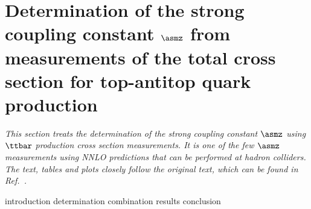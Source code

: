 \section{Determination of the strong coupling constant \texorpdfstring{$\asmz$}{alpha_s(mZ)} from measurements of the total cross section for top-antitop quark production}

\emph{%
This section treats the determination of the strong coupling constant $\asmz$ using $\ttbar$ production cross section measurements.
% 
It is one of the few $\asmz$ measurements using NNLO predictions that can be performed at hadron colliders.
% 
The text, tables and plots closely follow the original text, which can be found in Ref.~\cite{Klijnsma:2017eqp}.
}

{introduction}
{determination}
{combination}
{results}
{conclusion}

